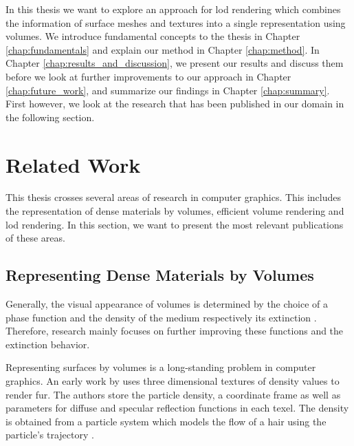 In this thesis we want to explore an approach for \acl{lod} rendering which combines the information of surface meshes and textures into a single representation using volumes.
We introduce fundamental concepts to the thesis in Chapter \ref{chap:fundamentals} and explain our method in Chapter \ref{chap:method}.
In Chapter \ref{chap:results_and_discussion}, we present our results and discuss them before we look at further improvements to our approach in Chapter \ref{chap:future_work}, and summarize our findings in Chapter \ref{chap:summary}.
First however, we look at the research that has been published in our domain in the following section.
\section{Related Work}
This thesis crosses several areas of research in computer graphics.
This includes the representation of dense materials by volumes, efficient volume rendering and \ac{lod} rendering.
In this section, we want to present the most relevant publications of these areas.

\subsection{Representing Dense Materials by Volumes}
Generally, the visual appearance of volumes is determined by the choice of a phase function and the density of the medium respectively its extinction \cite{pbr}.
Therefore, research mainly focuses on further improving these functions and the extinction behavior.

Representing surfaces by volumes is a long-standing problem in computer graphics.
An early work by \citeauthor{kajiya_rendering_fur_with_textures} uses three dimensional textures of density values to render fur.
The authors store the particle density, a coordinate frame as well as parameters for diffuse and specular reflection functions in each texel.
The density is obtained from a particle system which models the flow of a hair using the particle's trajectory \cite{kajiya_rendering_fur_with_textures}.

